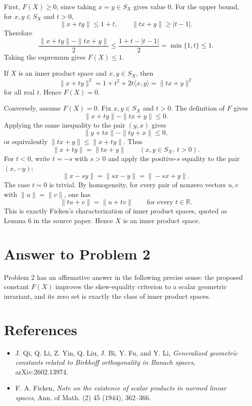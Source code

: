 \documentclass[11pt]{article}
\newcommand{\SX}{S_X}
\begin{document}
First, \(F(X)\ge 0\), since taking \(x=y\in \SX\) gives value \(0\).  For the
upper bound, for \(x,y\in \SX\) and \(t>0\),
\[
\|x+t y\|\le 1+t,
\qquad
\|t x+y\|\ge |t-1|.
\]
Therefore
\[
\frac{\|x+t y\|-\|t x+y\|}{2}
\le
\frac{1+t-|t-1|}{2}
=\min\{1,t\}\le 1.
\]
Taking the supremum gives \(F(X)\le 1\).

If \(X\) is an inner product space and \(x,y\in \SX\), then
\[
\|x+t y\|^2 = 1+t^2+2t\langle x,y\rangle
= \|t x+y\|^2
\]
for all real \(t\).  Hence \(F(X)=0\).

Conversely, assume \(F(X)=0\).  Fix \(x,y\in \SX\) and \(t>0\).  The definition
of \(F\) gives
\[
\|x+t y\|-\|t x+y\|\le 0.
\]
Applying the same inequality to the pair \((y,x)\) gives
\[
\|y+t x\|-\|t y+x\|\le 0,
\]
or equivalently \(\|t x+y\|\le \|x+t y\|\).  Thus
\[
\|x+t y\|=\|t x+y\|
\qquad (x,y\in \SX,\ t>0).
\]
For \(t<0\), write \(t=-s\) with \(s>0\) and apply the positive-\(s\) equality
to the pair \((x,-y)\):
\[
\|x-sy\|=\|s x-y\|=\|-s x+y\|.
\]
The case \(t=0\) is trivial.  By homogeneity, for every pair of nonzero vectors
\(u,v\) with \(\|u\|=\|v\|\), one has
\[
\|t u+v\|=\|u+t v\|
\qquad\text{for every }t\in\mathbb{R}.
\]
This is exactly Ficken's characterization of inner product spaces, quoted as
Lemma 6 in the source paper.  Hence \(X\) is an inner product space.

\section{Answer to Problem 2}

Problem 2 has an affirmative answer in the following precise sense: the
proposed constant \(F(X)\) improves the skew-equality criterion to a scalar
geometric invariant, and its zero set is exactly the class of inner product
spaces.

\section{References}

\begin{itemize}[leftmargin=*]
\item J. Qi, Q. Li, Z. Yin, Q. Liu, J. Bi, Y. Fu, and Y. Li, \emph{Generalized
geometric constants related to Birkhoff orthogonality in Banach spaces},
arXiv:2602.13974.
\item F. A. Ficken, \emph{Note on the existence of scalar products in normed
linear spaces}, Ann. of Math. (2) 45 (1944), 362--366.
\end{itemize}
\end{document}
